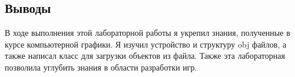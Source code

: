 \documentclass[12pt]{article}
\begin{document}
\subsection*{Выводы}

В ходе выполнения этой лабораторной работы я укрепил знания, полученные в курсе компьютерной графики.
Я изучил устройство и структуру obj файлов, а также написал класс для загрузки объектов из файла.
Также эта лабораторная позволила углубить знания в области разработки игр.
\end{document}
